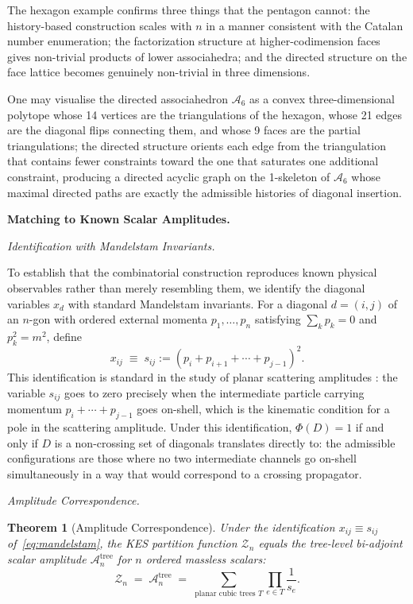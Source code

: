 \documentclass[12pt, oneside]{amsart}
\theoremstyle{plain}
\newtheorem{theorem}{Theorem}[section]
\theoremstyle{definition}
\theoremstyle{remark}
\newcommand{\Phif}{\Phi}
\begin{document}
The hexagon example confirms three things that the pentagon cannot: the history-based construction scales with $n$ in a manner consistent with the Catalan number enumeration; the factorization structure at higher-codimension faces gives non-trivial products of lower associahedra; and the directed structure on the face lattice becomes genuinely non-trivial in three dimensions.

One may visualise the directed associahedron $\mathcal{A}_6$ as a convex three-dimensional polytope whose 14 vertices are the triangulations of the hexagon, whose 21 edges are the diagonal flips connecting them, and whose 9 faces are the partial triangulations; the directed structure orients each edge from the triangulation that contains fewer constraints toward the one that saturates one additional constraint, producing a directed acyclic graph on the 1-skeleton of $\mathcal{A}_6$ whose maximal directed paths are exactly the admissible histories of diagonal insertion.

\bigskip\noindent\textbf{Matching to Known Scalar Amplitudes.}
\label{sec:matching}

\medskip\noindent\textit{Identification with Mandelstam Invariants.}

To establish that the combinatorial construction reproduces known physical
observables rather than merely resembling them, we identify the diagonal
variables $x_d$ with standard Mandelstam invariants. For a diagonal
$d = (i,j)$ of an $n$-gon with ordered external momenta
$p_1, \ldots, p_n$ satisfying $\sum_k p_k = 0$ and $p_k^2 = m^2$,
define
\begin{equation}
\label{eq:mandelstam}
  x_{ij} \;\equiv\; s_{ij} := (p_i + p_{i+1} + \cdots + p_{j-1})^2.
\end{equation}
This identification is standard in the study of planar scattering amplitudes
\cite{ABHY2018}: the variable $s_{ij}$ goes to zero precisely when the
intermediate particle carrying momentum $p_i + \cdots + p_{j-1}$ goes
on-shell, which is the kinematic condition for a pole in the scattering
amplitude. Under this identification, $\Phif(D) = 1$ if and only if $D$ is
a non-crossing set of diagonals translates directly to: the admissible
configurations are those where no two intermediate channels go on-shell
simultaneously in a way that would correspond to a crossing propagator.

\medskip\noindent\textit{Amplitude Correspondence.}

\begin{theorem}[Amplitude Correspondence]
\label{thm:amplitude}
Under the identification $x_{ij} \equiv s_{ij}$ of~\eqref{eq:mandelstam},
the KES partition function $\mathcal{Z}_n$ equals the
tree-level bi-adjoint scalar amplitude $\mathcal{A}_n^{\mathrm{tree}}$
for $n$ ordered massless scalars:
\[
  \mathcal{Z}_n \;=\; \mathcal{A}_n^{\mathrm{tree}}
  \;=\; \sum_{\text{planar cubic trees } T}
  \prod_{e \in T} \frac{1}{s_e}.
\]
\end{theorem}
\end{document}
